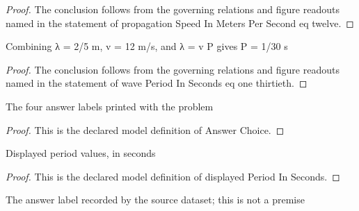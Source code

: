\begin{proof}
  The conclusion follows from the governing relations and figure readouts named in the statement of propagation Speed In Meters Per Second eq twelve.
\end{proof}
\begin{lemma}
  \label{lem:physics:phyx-mini-0291:phyxminiproblems-problemphyxmini0291-waveperiodinseconds-eq-one-thirtieth}
  Combining λ = 2/5 m, v = 12 m/s, and λ = v P gives P = 1/30 s
\end{lemma}
\begin{proof}
  The conclusion follows from the governing relations and figure readouts named in the statement of wave Period In Seconds eq one thirtieth.
\end{proof}
\begin{definition}
  \label{def:physics:phyx-mini-0291:phyxminiproblems-problemphyxmini0291-answerchoice}
  The four answer labels printed with the problem
\end{definition}
\begin{proof}
  This is the declared model definition of Answer Choice.
\end{proof}
\begin{definition}
  \label{def:physics:phyx-mini-0291:phyxminiproblems-problemphyxmini0291-displayedperiodinseconds}
  Displayed period values, in seconds
\end{definition}
\begin{proof}
  This is the declared model definition of displayed Period In Seconds.
\end{proof}
\begin{definition}
  \label{def:physics:phyx-mini-0291:phyxminiproblems-problemphyxmini0291-recordeddatasetanswer}
  The answer label recorded by the source dataset; this is not a premise
\end{definition}
